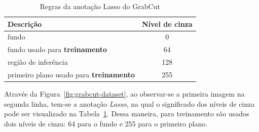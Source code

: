 \begin{figure}[h!]
        \captionsetup{width=12cm}
		\centering
        {}
\end{figure}
\FloatBarrier{}

\begin{table}[h]
  \centering
  \caption{Regras da anotação Lasso do GrabCut}\label{tab:grabcut-label}
  \begin{tabular}{lc}
    \toprule
    Descrição                                       & Nível de cinza \\
    \midrule \midrule
     fundo                                          & 0              \\
     fundo usado para \textbf{treinamento}          & 64             \\
     região de inferência                           & 128            \\
     primeiro plano usado para \textbf{treinamento} & 255            \\
    \bottomrule
  \end{tabular}
\end{table}


Através da Figura~\ref{fig:grabcut-dataset}, ao observar-se a primeira
imagem na segunda linha, tem-se a anotação \textit{Lasso}, na qual o
significado dos níveis de cinza pode ser visualizado na
Tabela~\ref{tab:grabcut-label}. Dessa maneira, para
treinamento\footnotemark{} são usados dois níveis de cinza: 64 para o
fundo e 255 para o primeiro plano.

